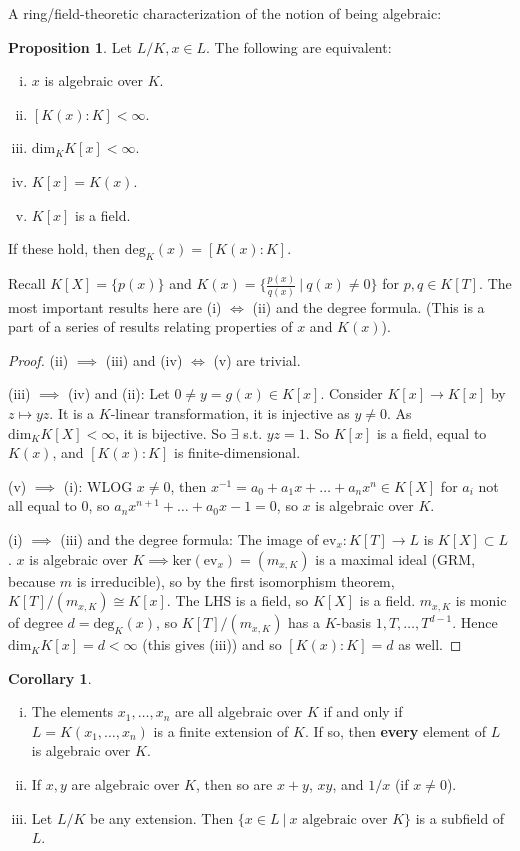 \documentclass{article}
\theoremstyle{definition}
\newtheorem{cor}[theorem]{Corollary}
\newtheorem{prop}[theorem]{Proposition}
\begin{document}
A ring/field-theoretic characterization of the notion of being algebraic: 
\begin{prop}
    Let $L/K, x \in L$. The following are equivalent:
    \begin{enumerate}[(i)]
        \item $x$ is algebraic over $K$.
        \item $[K(x) : K] < \infty$.
        \item $\text{dim}_K K[x] < \infty$.
        \item $K[x] = K(x)$.
        \item $K[x]$ is a field.
    \end{enumerate}
    If these hold, then $\text{deg}_K(x) = [K(x) : K]$.
\end{prop}
Recall $K[X] = \{p(x)\}$ and $K(x) = \{\frac{p(x)}{q(x)}~|~ q(x) \neq 0\}$ for $p,q \in K[T]$. The most important results here are (i) $\iff$ (ii) and the degree formula. (This is a part of a series of results relating properties of $x$ and $K(x)$).
\begin{proof}
    (ii) $\implies $ (iii) and (iv) $\iff$ (v) are trivial.
    \vspace{1mm}
    
    (iii) $\implies$ (iv) and (ii): Let $0 \neq y = g(x) \in K[x]$. Consider $K[x] \to K[x]$ by $z \mapsto yz$. It is a $K$-linear transformation, it is injective as $y\neq 0$. As $\text{dim}_K K[X] < \infty$, it is bijective. So $\exists $ s.t. $yz = 1$. So $K[x]$ is a field, equal to $K(x)$, and $[K(x):K]$ is finite-dimensional.
    \vspace{1mm}
    
    (v) $\implies$ (i): WLOG $x\neq 0$, then $x^{-1} = a_0 + a_1x + \ldots + a_n x^n \in K[X]$ for $a_i$ not all equal to $0$, so $a_nx^{n+1} + \ldots + a_0x - 1 =0$, so $x$ is algebraic over $K$.
    \vspace{1mm}
    
    (i) $\implies$ (iii) and the degree formula: The image of $\text{ev}_x : K[T] \to L$ is $K[X] \subset L$. $x$ is algebraic over $K \implies \text{ker}(\text{ev}_x) = (m_{x,K})$ is a maximal ideal (GRM, because $m$ is irreducible), so by the first isomorphism theorem, $K[T]/(m_{x,K}) \cong K[x]$. The LHS is a field, so $K[X]$ is a field. $m_{x,K}$ is monic of degree $d = \text{deg}_K(x)$, so $K[T]/(m_{x,K})$ has a $K$-basis $1,T,\ldots,T^{d-1}$. Hence $\text{dim}_K K[x] = d < \infty$ (this gives (iii)) and so $[K(x) : K] = d$ as well.
\end{proof}
\begin{cor}
    \begin{enumerate}[(i)]
        \item The elements $x_1,\ldots,x_n$ are all algebraic over $K$ if and only if ${L = K(x_1,\ldots,x_n)}$ is a finite extension of $K$. If so, then \textbf{every} element of $L$ is algebraic over $K$.
        \item If $x,y$ are algebraic over $K$, then so are $x+y$, $xy$, and $1/x$ (if $x \neq 0$).
        \item Let $L/K$ be any extension. Then $\{x \in L ~|~ x \text{ algebraic over }K\}$ is a subfield of $L$.
    \end{enumerate}
\end{cor}
\end{document}
